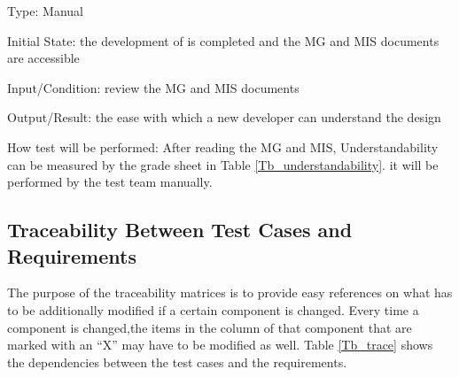\documentclass[12pt, titlepage]{article}
\begin{document}
\begin{enumerate}
Type: Manual
					
Initial State: the development of \progname{} is completed and the MG and MIS
documents are accessible
					
Input/Condition: review the MG and MIS documents
					
Output/Result: the ease
with which a new developer can understand the design
					
How test will be performed: After reading the MG and MIS, Understandability can
be measured by the grade sheet in Table \ref{Tb_understandability}. it will be
performed by the test team manually.

\end{enumerate}


\subsection{Traceability Between Test Cases and Requirements}

The purpose of the traceability matrices is to provide easy references on what
has to be additionally modified if a certain component is changed. Every time a
component is changed,the items in the column of that component that are marked
with an “X” may have to be modified as well. Table \ref{Tb_trace} shows the
dependencies between the test cases and the requirements.
\end{document}

